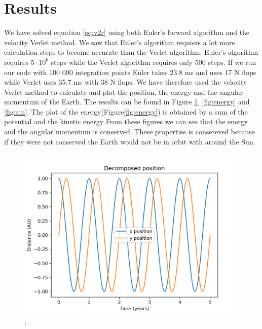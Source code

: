 \documentclass{article}
\begin{document}
\section{Results}
We have solved equation \ref{eq:v2r} using both Euler's forward algorithm and the velocity Verlet method. We saw that Euler's algorithm requiers a lot more calculation steps to become accurate than the Verlet algorithm. Euler's algorithm requires $5 \cdot 10^6$ steps while the Verlet algorithm requires only 500 steps. If we run our code with 100 000 integration points Euler takes 23.8 ms and uses 17 N flops while Verlet uses 35.7 ms with 38 N flops. We have therefore used the velocity Verlet method to calculate and plot the position, the energy and the angular momentum of the Earth. The results can be found in Figure \ref{fig:position}, \ref{fig:energy} and \ref{fig:am}. The plot of the energy(Figure\ref{fig:energy}) is obtained by a sum of the potential and the kinetic energy From these figures we can see that the energy and the angular momentum is conserved. These properties is consereved because if they were not conserved the Earth would not be in orbit with around the Sun. 

\begin{figure}[H]
    \begin{center}
        \includegraphics[width=\textwidth]{./Plot/xy_vs_time.png}
        \caption{: }
        \label{fig:position}
    \end{center}
\end{figure}
\end{document}

